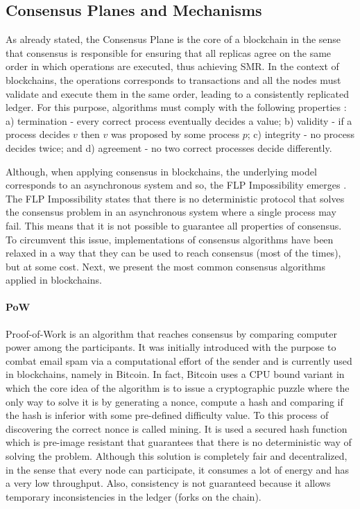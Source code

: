 \subsection{Consensus Planes and Mechanisms}
\label{subsec:arch_service_planes:consensus}


As already stated, the Consensus Plane is the core of a blockchain in the sense that consensus is responsible for ensuring that all replicas agree on the same order in which operations are executed, thus achieving \gls{SMR}. In the context of blockchains, the operations corresponds to transactions and all the nodes must validate and execute them in the same order, leading to a consistently replicated ledger. For this purpose, algorithms must comply with the following properties \cite{book_reliable_secure_distributed_programming}: a) termination - every correct process eventually decides a value; b) validity - if a process decides $v$ then $v$ was proposed by some process $p$; c) integrity - no process decides twice; and d) agreement - no two correct processes decide differently. 

Although, when applying consensus in blockchains, the underlying model corresponds to an asynchronous system and so, the FLP Impossibility emerges \cite{flp}. The FLP Impossibility states that there is no deterministic protocol that solves the consensus problem in an asynchronous system where a single process may fail. This means that it is not possible to guarantee all properties of consensus. To circumvent this issue, implementations of consensus algorithms have been relaxed in a way that they can be used to reach consensus (most of the times), but at some cost. Next, we present the most common consensus algorithms applied in blockchains.

\paragraph{\gls{PoW}} Proof-of-Work \cite{pow} is an algorithm that reaches consensus by comparing computer power among the participants. It was initially introduced with the purpose to combat email spam via a computational effort of the sender \cite{pow_email_spam} and is currently used in blockchains, namely in Bitcoin. In fact, Bitcoin uses a \gls{CPU} bound variant in which the core idea of the algorithm is to issue a cryptographic puzzle where the only way to solve it is by generating a nonce, compute a hash and comparing if the hash is inferior with some pre-defined difficulty value. To this process of discovering the correct nonce is called mining. It is used a secured hash function which is pre-image resistant that guarantees that there is no deterministic way of solving the problem. Although this solution is completely fair and decentralized, in the sense that every node can participate, it consumes a lot of energy and has a very low throughput. Also, consistency is not guaranteed because it allows temporary inconsistencies in the ledger (forks on the chain).

